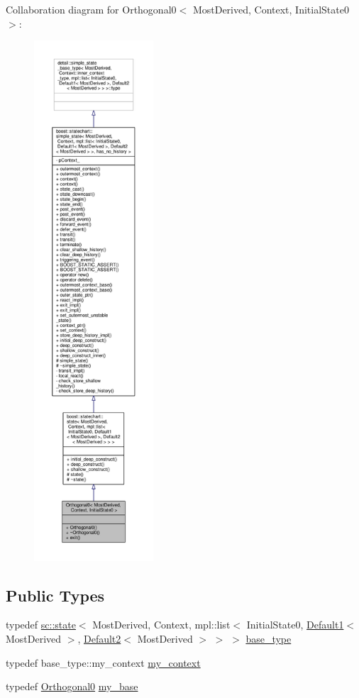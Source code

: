 Collaboration diagram for Orthogonal0$<$ Most\+Derived, Context, Initial\+State0 $>$\+:
\nopagebreak
\begin{figure}[H]
\begin{center}
\leavevmode
\includegraphics[height=550pt]{struct_orthogonal0__coll__graph}
\end{center}
\end{figure}
\subsection*{Public Types}
\begin{DoxyCompactItemize}
\item 
typedef \mbox{\hyperlink{classboost_1_1statechart_1_1state}{sc\+::state}}$<$ Most\+Derived, Context, mpl\+::list$<$ Initial\+State0, \mbox{\hyperlink{struct_default1}{Default1}}$<$ Most\+Derived $>$, \mbox{\hyperlink{struct_default2}{Default2}}$<$ Most\+Derived $>$ $>$ $>$ \mbox{\hyperlink{struct_orthogonal0_a135d1336c31ba010c0fb4278929a5ee4}{base\+\_\+type}}
\item 
typedef base\+\_\+type\+::my\+\_\+context \mbox{\hyperlink{struct_orthogonal0_a9e83fb13d36d05273364de4b3101f135}{my\+\_\+context}}
\item 
typedef \mbox{\hyperlink{struct_orthogonal0}{Orthogonal0}} \mbox{\hyperlink{struct_orthogonal0_abb626b2be8b94179a3b2404893065960}{my\+\_\+base}}
\end{DoxyCompactItemize}
